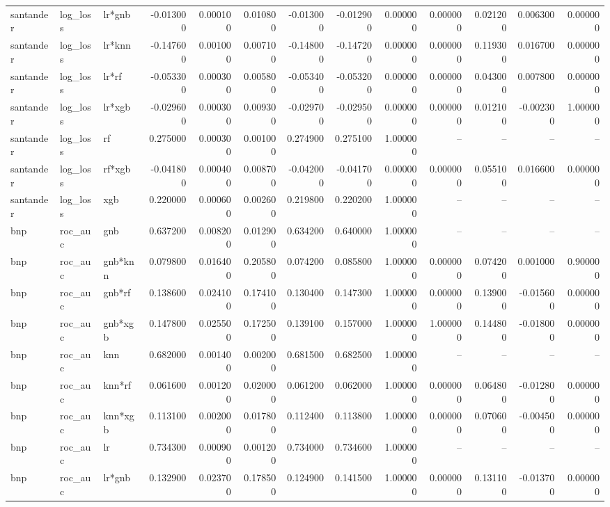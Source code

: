 \begin{landscape}
\begin{longtable}{lllrrrrrrrrrr}
santander & log\_loss & lr*gnb & -0.013000 & 0.000100 & 0.010800 & -0.013000 & -0.012900 & 0.000000 & 0.000000 & 0.021200 & 0.006300 & 0.000000 \\
santander & log\_loss & lr*knn & -0.147600 & 0.001000 & 0.007100 & -0.148000 & -0.147200 & 0.000000 & 0.000000 & 0.119300 & 0.016700 & 0.000000 \\
santander & log\_loss & lr*rf & -0.053300 & 0.000300 & 0.005800 & -0.053400 & -0.053200 & 0.000000 & 0.000000 & 0.043000 & 0.007800 & 0.000000 \\
santander & log\_loss & lr*xgb & -0.029600 & 0.000300 & 0.009300 & -0.029700 & -0.029500 & 0.000000 & 0.000000 & 0.012100 & -0.002300 & 1.000000 \\
santander & log\_loss & rf & 0.275000 & 0.000300 & 0.001000 & 0.274900 & 0.275100 & 1.000000 & -- & -- & -- & -- \\
santander & log\_loss & rf*xgb & -0.041800 & 0.000400 & 0.008700 & -0.042000 & -0.041700 & 0.000000 & 0.000000 & 0.055100 & 0.016600 & 0.000000 \\
santander & log\_loss & xgb & 0.220000 & 0.000600 & 0.002600 & 0.219800 & 0.220200 & 1.000000 & -- & -- & -- & -- \\
bnp & roc\_auc & gnb & 0.637200 & 0.008200 & 0.012900 & 0.634200 & 0.640000 & 1.000000 & -- & -- & -- & -- \\
bnp & roc\_auc & gnb*knn & 0.079800 & 0.016400 & 0.205800 & 0.074200 & 0.085800 & 1.000000 & 0.000000 & 0.074200 & 0.001000 & 0.900000 \\
bnp & roc\_auc & gnb*rf & 0.138600 & 0.024100 & 0.174100 & 0.130400 & 0.147300 & 1.000000 & 0.000000 & 0.139000 & -0.015600 & 0.000000 \\
bnp & roc\_auc & gnb*xgb & 0.147800 & 0.025500 & 0.172500 & 0.139100 & 0.157000 & 1.000000 & 1.000000 & 0.144800 & -0.018000 & 0.000000 \\
bnp & roc\_auc & knn & 0.682000 & 0.001400 & 0.002000 & 0.681500 & 0.682500 & 1.000000 & -- & -- & -- & -- \\
bnp & roc\_auc & knn*rf & 0.061600 & 0.001200 & 0.020000 & 0.061200 & 0.062000 & 1.000000 & 0.000000 & 0.064800 & -0.012800 & 0.000000 \\
bnp & roc\_auc & knn*xgb & 0.113100 & 0.002000 & 0.017800 & 0.112400 & 0.113800 & 1.000000 & 0.000000 & 0.070600 & -0.004500 & 0.000000 \\
bnp & roc\_auc & lr & 0.734300 & 0.000900 & 0.001200 & 0.734000 & 0.734600 & 1.000000 & -- & -- & -- & -- \\
bnp & roc\_auc & lr*gnb & 0.132900 & 0.023700 & 0.178500 & 0.124900 & 0.141500 & 1.000000 & 0.000000 & 0.131100 & -0.013700 & 0.000000 \\

\end{longtable}
\end{landscape}
